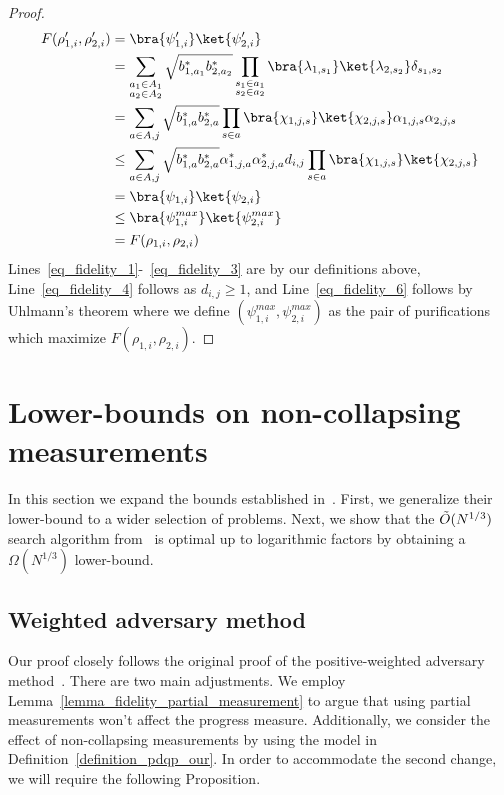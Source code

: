 \begin{proof}
\begin{align}
        F(\rho^\prime_{1, i}, \rho^\prime_{2, i}) &= \bra{\psi^\prime_{1,i}}\ket{\psi^\prime_{2,i}} \label{eq_fidelity_1}\\
        &= \sum_{\substack{a_1\in A_1 \\ a_2\in A_2}} \sqrt{b^*_{1,a_1}b^*_{2,a_2}} \prod_{\substack{s_1\in a_1 \\ s_2\in a_2}} \bra{\lambda_{1,s_1}}\ket{\lambda_{2,s_2}} \delta_{s_1,s_2} \\
        &= \sum_{a\in A, j} \sqrt{b^*_{1,a}b^*_{2,a}} \prod_{s\in a} \bra{\chi_{1, j, s}}\ket{\chi_{2,j,s}}\alpha_{1,j,s}\alpha_{2,j,s} \label{eq_fidelity_3}\\
        &\leq \sum_{a\in A, j} \sqrt{b^*_{1,a}b^*_{2,a}} \alpha^*_{1,j,a}\alpha^*_{2,j,a} d_{i,j} \prod_{s\in a} \bra{\chi_{1, j, s}}\ket{\chi_{2,j,s}} \label{eq_fidelity_4}\\
        &= \bra{\psi_{1,i}}\ket{\psi_{2,i}} \label{eq_fidelity_5}\\
        & \leq \bra{\psi^{max}_{1,i}}\ket{\psi^{max}_{2,i}} \label{eq_fidelity_6}\\
        &= F(\rho_{1, i}, \rho_{2, i})
    \end{align}
    Lines~\ref{eq_fidelity_1}-~\ref{eq_fidelity_3} are by our definitions above, Line~\ref{eq_fidelity_4} follows as $d_{i,j}\geq 1$, and Line~\ref{eq_fidelity_6} follows by Uhlmann's theorem where we define $(\psi^{max}_{1,i},\psi^{max}_{2,i})$ as the pair of purifications which maximize $F(\rho_{1,i}, \rho_{2, i})$.
\end{proof}

\section{Lower-bounds on non-collapsing measurements}

In this section we expand the bounds established in~\cite{space_above_bqp}. First, we generalize their lower-bound to a wider selection of problems. Next, we show that the $\Tilde{O}(N^{1/3})$ search algorithm from~\cite{space_above_bqp} is optimal up to logarithmic factors by obtaining a $\Omega(N^{1/3})$ lower-bound.

\subsection{Weighted adversary method}

Our proof closely follows the original proof of the positive-weighted adversary method~\cite{weighted_adversary}. There are two main adjustments. We employ Lemma~\ref{lemma_fidelity_partial_measurement} to argue that using partial measurements won't affect the progress measure. Additionally, we consider the effect of non-collapsing measurements by using the model in Definition~\ref{definition_pdqp_our}. In order to accommodate the second change, we will require the following Proposition.

